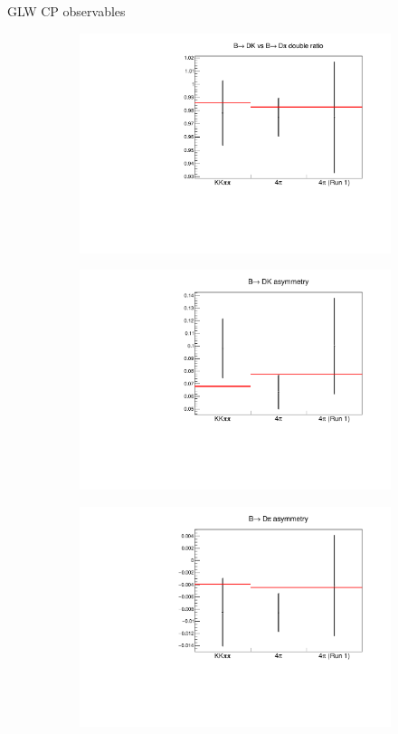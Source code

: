 \documentclass{beamer}
\begin{document}
\begin{frame}{GLW CP observables}
  \begin{figure}
    \centering
    \begin{subfigure}{0.4\textwidth}
      \includegraphics[width = 1.0\textwidth]{Plots/R_CP.pdf}
    \end{subfigure}
    \begin{subfigure}{0.4\textwidth}
      \includegraphics[width = 1.0\textwidth]{Plots/B2DK_Asymmetry.pdf}
    \end{subfigure}%
    \begin{subfigure}{0.4\textwidth}
      \includegraphics[width = 1.0\textwidth]{Plots/B2Dpi_Asymmetry.pdf}

\end{subfigure}
\end{figure}
\end{frame}
\end{document}

